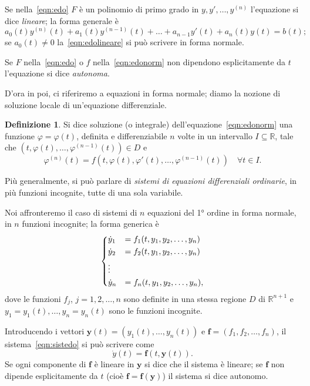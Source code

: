 \documentclass[a4paper]{book}
\numberwithin{equation}{section}
\renewcommand{\phi}{\varphi}
\theoremstyle{plain}
\theoremstyle{definition}
\newtheorem{defn}{Definizione}[section]
\theoremstyle{remark}
\renewcommand{\vec}{\boldsymbol}
\theoremstyle{example}
\begin{document}
Se nella~\eqref{eqn:edo} $F$ è un polinomio di primo grado in $y, y', \dots, y^{(n)}$ l'equazione si dice \emph{lineare}; la forma generale è
	\begin{equation}
		\label{eqn:edolineare}
		a_0(t)y^{(n)}(t) + a_1(t)y^{(n-1)}(t) + \dots + a_{n-1}y'(t) + a_n(t)y(t) = b(t);
	\end{equation}
se $a_0(t) \ne 0$ la~\eqref{eqn:edolineare} si può scrivere in forma normale.

Se $F$ nella~\eqref{eqn:edo} o $f$ nella~\eqref{eqn:edonorm} non dipendono esplicitamente da $t$ l'equazione si dice \emph{autonoma}.

D'ora in poi, ci riferiremo a equazioni in forma normale; diamo la nozione di soluzione locale di un'equazione differenziale.
	\begin{defn}
		Si dice soluzione (o integrale) dell'equazione~\eqref{eqn:edonorm} una funzione $\phi = \phi(t)$, definita e differenziabile $n$ volte in un intervallo $I \subseteq \mathbb{R}$, tale che $(t, \phi(t), \dots, \phi^{(n-1)}(t)) \in D$ e
			\begin{equation}
				\phi^{(n)}(t) = f(t, \phi(t), \phi'(t), \dots, \phi^{(n-1)}(t)) \quad \forall t \in I.
			\end{equation}
	\end{defn}

	Più generalmente, si può parlare di \emph{sistemi di equazioni differenziali ordinarie}, in più funzioni incognite, tutte di una sola variabile.

	Noi affronteremo il caso di sistemi di $n$ equazioni del 1° ordine in forma normale, in $n$ funzioni incognite; la forma generica è
		\begin{equation}
			\label{eqn:sistedo}
			\begin{dcases}
				\dot{y}_1 &= f_1 (t, y_1, y_2, \dots, y_n) \\
				\dot{y}_2 &= f_2 (t, y_1, y_2, \dots, y_n) \\
				\vdots \\
				\dot{y}_n &= f_n(t, y_1, y_2, \dots, y_n),
			\end{dcases}
		\end{equation}
	dove le funzioni $f_j$, $j = 1, 2, \dots, n$ sono definite in una stessa regione $D$ di $\mathbb{R}^{n+1}$ e $y_1 = y_1(t), \dots, y_n = y_n(t)$ sono le funzioni incognite.

	Introducendo i vettori $\vec{y}(t) = (y_1(t), \dots, y_n(t))$ e $\vec{f} = (f_1, f_2, \dots, f_n)$, il sistema~\eqref{eqn:sistedo} si può scrivere come
		\begin{equation}
			\dot{y}(t) = \vec{f}(t, \vec{y}(t)).
		\end{equation}
	Se ogni componente di $\vec{f}$ è lineare in $\vec{y}$ si dice che il sistema è lineare; se $\vec{f}$ non dipende esplicitamente da $t$ (cioè $\vec{f} = \vec{f}(\vec{y})$) il sistema si dice autonomo.
\end{document}
